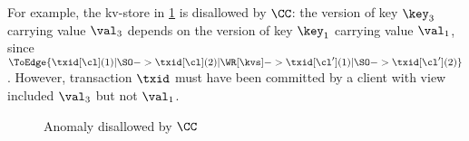 For example, the kv-store in \cref{fig:wr-wfr-allowed-but-cc} is disallowed by \(\CC\): 
the version of key \(\key_3\) carrying value \(\val_3\) depends on 
the version of key \(\key_1\) carrying value \(\val_1\),
since \( \ToEdge{ \txid[\cl](1) | \SO -> \txid[\cl](2) | \WR[\kvs] 
            -> \txid[\cl'](1) | \SO -> \txid[\cl'](2)} \).
However, transaction \(\txid\) must have been committed by a client with 
view included \(\val_3\) but not \(\val_1\).

\begin{figure}
\centering
{}%

\hrulefill

\caption{Anomaly disallowed by \( \CC \)}
\label{fig:wr-wfr-allowed-but-cc}
\end{figure}%
